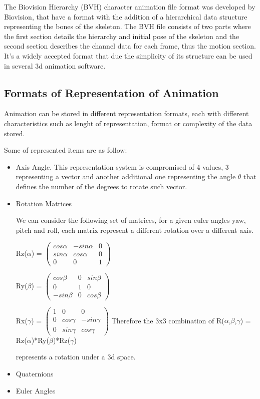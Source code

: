 The Biovision Hierarchy (BVH) character animation file format was developed by Biovision,   
that have a format with the addition of a hierarchical data structure 
representing the bones of the skeleton. The BVH file consists of two parts
where the first section details the hierarchy and initial pose of the skeleton and the second section
describes the channel data for each frame, thus the motion section.
It's a widely accepted format that due the simplicity of its structure can be used in several
3d animation software.

\subsection{Formats of Representation of Animation} \label{subsec:AnimationRepresentationFormats}

Animation can be stored in different representation formats, each with different characteristics such as lenght of representation,  format or complexity of the data stored.

Some of represented items are as follow:

\begin{itemize} 
	\item  Axis Angle.
	This representation system is compromised of 4 values, 3 representing a vector and another additional one representing 
	the angle $\theta$ that defines the number of the degrees to rotate such vector.
	\item  Rotation Matrices
	
	We can consider the following set of matrices, for a given euler angles yaw, pitch and roll, each matrix
	represent a different rotation over a different axis.
	
	Rz($\alpha$) = 
	$\begin{pmatrix} 
	cos \alpha & -sin \alpha & 0 \\ 
	sin \alpha & cos \alpha & 0 \\ 
	0 & 0 & 1  
	\end{pmatrix} $
		
	Ry($\beta$) = 
	$\begin{pmatrix} 
	cos \beta & 0 & sin \beta \\ 
	0 & 1 & 0 \\ 
	-sin \beta & 0 & cos \beta  
	\end{pmatrix} $
	
	Rx($\gamma$) = 
	$\begin{pmatrix} 
	1 & 0 & 0 \\ 
	0 & cos \gamma & -sin \gamma \\ 
	0 & sin \gamma & cos \gamma  
	\end{pmatrix} $ 
	\bigbreak \bigbreak 
	Therefore the 3x3 combination of
	R($\alpha$,$\beta$,$\gamma$) = Rz($\alpha$)*Ry($\beta$)*Rz($\gamma$)
	
	represents a rotation under a 3d space.
	
	\item  Quaternions
	
	\item  Euler Angles
	
\end{itemize}
